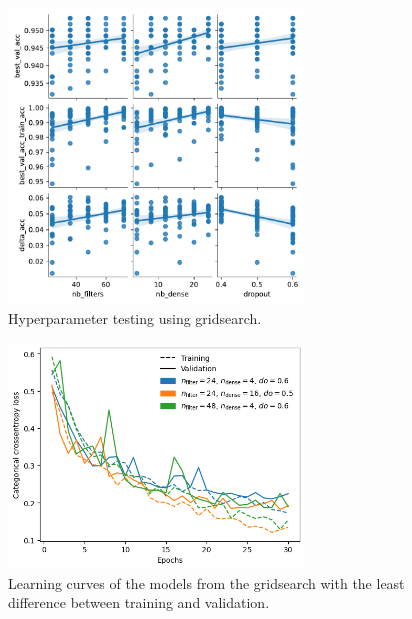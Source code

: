 \begin{figure}[H]
    \centering
    \includegraphics[width=0.7\textwidth]{plots/pairplot.pdf}
    \caption{Hyperparameter testing using gridsearch.}
    \label{fig:gridsearch}
\end{figure}

\begin{figure}[H]
    \centering
    \includegraphics[width=0.7\textwidth]{plots/SmallestDelta_LearningCurves.png}
    \caption{Learning curves of the models from the gridsearch with the least difference between training and validation.}
    \label{fig:SmallestDelta_LearningCurves}
\end{figure}


